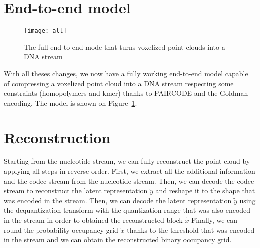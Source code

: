 \section{End-to-end model}

\begin{figure}
    \centering
    \texttt{[image: all]}
    \caption{The full end-to-end mode that turns voxelized point clouds into a DNA stream}
    \label{fig:end-to-end}
\end{figure}

With all theses changes, we now have a fully working end-to-end model capable of compressing a voxelized point cloud into a DNA stream respecting some constraints (homopolymers and kmer) thanks to PAIRCODE and the Goldman encoding. The model is shown on Figure~\ref{fig:end-to-end}.

\section{Reconstruction}

Starting from the nucleotide stream, we can fully reconstruct the point cloud by applying all steps in reverse order.
First, we extract all the additional information and the codec stream from the nucleotide stream. Then, we can decode the codec stream to reconstruct the latent representation $\tilde{y}$ and reshape it to the shape that was encoded in the stream.
Then, we can decode the latent representation $\tilde{y}$ using the dequantization transform with the quantization range that was also encoded in the stream in order to obtained the reconstructed block $\tilde{x}$
Finally, we can round the probability occupancy grid $\tilde{x}$ thanks to the threshold that was encoded in the stream and we can obtain the reconstructed binary occupancy grid.
